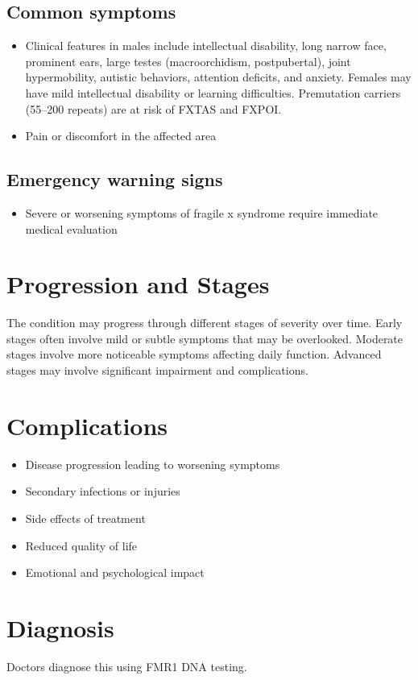 \subsection{Common symptoms}
\begin{itemize}[noitemsep]
  \item Clinical features in males include intellectual disability, long narrow face, prominent ears, large testes (macroorchidism, postpubertal), joint hypermobility, autistic behaviors, attention deficits, and anxiety. Females may have mild intellectual disability or learning difficulties. Premutation carriers (55--200 repeats) are at risk of FXTAS and FXPOI.

  \item Pain or discomfort in the affected area
  \end{itemize}

\subsection{Emergency warning signs}
\begin{itemize}[noitemsep]
  \item Severe or worsening symptoms of fragile x syndrome require immediate medical evaluation
\end{itemize}
\section{Progression and Stages}
The condition may progress through different stages of severity over time. Early stages often involve mild or subtle symptoms that may be overlooked. Moderate stages involve more noticeable symptoms affecting daily function. Advanced stages may involve significant impairment and complications.
\section{Complications}
\begin{itemize}[noitemsep]
  \item Disease progression leading to worsening symptoms
  \item Secondary infections or injuries
  \item Side effects of treatment
  \item Reduced quality of life
  \item Emotional and psychological impact
\end{itemize}
\section{Diagnosis}
Doctors diagnose this using FMR1 DNA testing.

